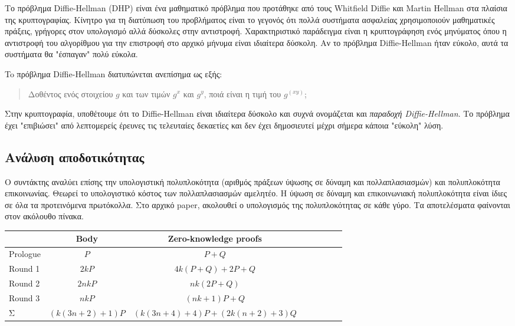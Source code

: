 \documentclass[letterpaper,11pt]{article}
\begin{document}
Το πρόβλημα Diffie-Hellman (DHP) είναι ένα μαθηματικό πρόβλημα που προτάθηκε από τους Whitfield Diffie και Martin Hellman στα πλαίσια της
κρυπτογραφίας. Κίνητρο για τη διατύπωση του προβλήματος είναι το γεγονός ότι πολλά συστήματα ασφαλείας χρησιμοποιούν μαθηματικές πράξεις, γρήγορες
στον υπολογισμό αλλά δύσκολες στην αντιστροφή. Χαρακτηριστικό παράδειγμα είναι η κρυπτογράφηση ενός μηνύματος όπου η αντιστροφή του αλγορίθμου για
την επιστροφή στο αρχικό μήνυμα είναι ιδιαίτερα δύσκολη. Αν το πρόβλημα Diffie-Hellman ήταν εύκολο, αυτά τα συστήματα θα "έσπαγαν" πολύ εύκολα.

To πρόβλημα Diffie-Hellman διατυπώνεται ανεπίσημα ως εξής:

 \begin{quote} Δοθέντος ενός στοιχείου $g$ και των τιμών $g^x$ και $g^y$, ποιά είναι η τιμή του $g^(xy)$; \end{quote}

Στην κρυπτογραφία, υποθέτουμε ότι το Diffie-Hellman είναι ιδιαίτερα δύσκολο και συχνά ονομάζεται και \emph{παραδοχή Diffie-Hellman}. Το πρόβλημα
έχει "επιβιώσει" από λεπτομερείς έρευνες τις τελευταίες δεκαετίες και δεν έχει δημοσιευτεί μέχρι σήμερα κάποια "εύκολη" λύση.

\subsection{Ανάλυση αποδοτικότητας}

Ο συντάκτης αναλύει επίσης την υπολογιστική πολυπλοκότητα (αριθμός πράξεων ύψωσης σε δύναμη και πολλαπλασιασμών) και πολυπλοκότητα επικοινωνίας.
Θεωρεί το υπολογιστικό κόστος των πολλαπλασιασμών αμελητέο. Η ύψωση σε δύναμη και επικοινωνιακή πολυπλοκότητα είναι ίδιες σε όλα τα
προτεινόμενα πρωτόκολλα. Στο αρχικό paper, ακολουθεί ο υπολογισμός της πολυπλοκότητας σε κάθε γύρο. Τα αποτελέσματα φαίνονται στον ακόλουθο πίνακα.

\begin{center}
\begin{tabular}{l*{6}{c}r}
		& Body 	& Zero-knowledge proofs\\
	\hline
	Prologue	& $P$ 				& $P+Q$				\\
	Round 1		& $2kP$				& $4k(P+Q)+2P+Q$	\\
	Round 2		& $2nkP$			& $nk(2P+Q)$		\\
	Round 3		& $nkP$				& $(nk+1)P+Q$		\\
	Σ			& $(k(3n+2)+1)P$	& $(k(3n+4)+4)P+(2k(n+2)+3)Q$\\	
\end{tabular}
\end{center}
\end{document}

